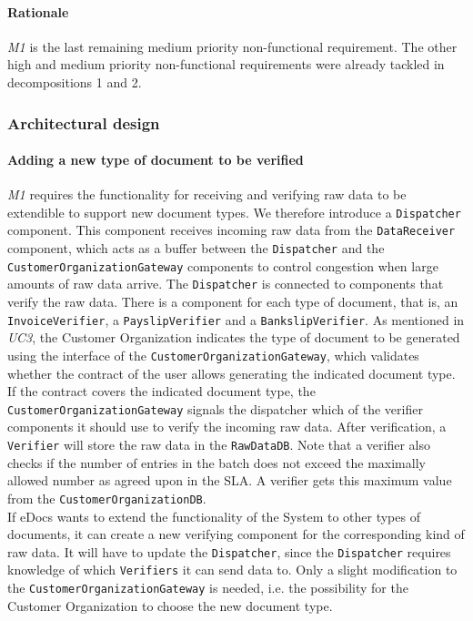 \documentclass[a4paper,10pt]{article}
\begin{document}
\paragraph{Rationale} \emph{M1} is the last remaining medium priority non-functional requirement. The other high and medium priority non-functional requirements were already tackled in decompositions 1 and 2. 
\subsubsection{Architectural design}
\paragraph{Adding a new type of document to be verified} \emph{M1} requires the functionality for receiving and verifying raw data to be extendible to support new document types. We therefore introduce a \texttt{Dispatcher} component. This component receives incoming raw data from the \texttt{DataReceiver} component, which acts as a buffer between the \texttt{Dispatcher} and the \texttt{CustomerOrganizationGateway} components to control congestion when large amounts of raw data arrive. The \texttt{Dispatcher} is connected to components that verify the raw data. There is a component for each type of document, that is, an \texttt{InvoiceVerifier}, a \texttt{PayslipVerifier} and a \texttt{BankslipVerifier}. As mentioned in \emph{UC3}, the Customer Organization indicates the type of document to be generated using the interface of the \texttt{CustomerOrganizationGateway}, which validates whether the contract of the user allows generating the indicated document type. If the contract covers the indicated document type, the \texttt{CustomerOrganizationGateway} signals the dispatcher which of the verifier components it should use to verify the incoming raw data. After verification, a \texttt{Verifier} will store the raw data in the \texttt{RawDataDB}. Note that a verifier also checks if the number of entries in the batch does not exceed the maximally allowed number as agreed upon in the SLA. A verifier gets this maximum value from the \texttt{CustomerOrganizationDB}.\\

If eDocs wants to extend the functionality  of the System to other types of documents, it can create a new verifying component for the corresponding kind of raw data. It will have to update the \texttt{Dispatcher}, since the \texttt{Dispatcher} requires knowledge of which \texttt{Verifiers} it can send data to. Only a slight modification to the \texttt{CustomerOrganizationGateway} is needed, i.e. the possibility for the Customer Organization to choose the new document type.
\end{document}
